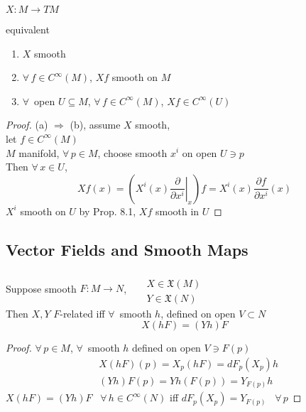 \begin{proposition}[8.14]
$X: M \to TM$ 

equivalent
\begin{enumerate}
\item[(a)] $X$ smooth 
\item[(b)] $\forall \, f \in C^{\infty}(M)$, $Xf $ smooth on $M$ 
\item[(c)] $\forall \, $ open $U \subseteq M$, $\forall \, f \in C^{\infty}(M)$, $Xf \in C^{\infty}(U)$
\end{enumerate}
\end{proposition}

\begin{proof}
  (a) $\Longrightarrow $ (b), assume $X$ smooth, \\
let $f\in C^{\infty}(M)$ \\
$M$ manifold, $\forall \, p \in M$, choose smooth $x^i$ on open $U\ni p$ \\
Then $\forall \, x \in U$, 
\[
Xf(x) = \left( \left. X^i(x) \frac{ \partial }{ \partial x^i} \right|_x \right) f = X^i(x) \frac{ \partial f}{ \partial x^i}(x)
\]
$X^i$ smooth on $U$ by Prop. 8.1, $Xf$ smooth in $U$
\end{proof}

\subsection*{Vector Fields and Smooth Maps}

\begin{proposition}[8.16]
  Suppose smooth $F:M\to N$, \quad \, $\begin{aligned} & \quad \\ 
    & X \in \mathfrak{X}(M) \\
    & Y \in \mathfrak{X}(N) \end{aligned}$ \\

Then $X,Y$ $F$-related iff $\forall \, $ smooth $h$, defined on open $V \subset N$ 
\[
X(hF) = (Yh)F
\]



\end{proposition}

\begin{proof}
$\forall \, p \in M$, $\forall \, $ smooth $h$ defined on open $V \ni F(p)$ 
\[
\begin{aligned}
  & X(hF)(p) = X_p(hF) = dF_p(X_p)h \\ 
  & (Yh)F(p) = Yh(F(p)) = Y_{F(p)}h
\end{aligned}
\]
$X(hF) = (Yh)F$ \quad \, $\forall \, h \in C^{\infty}(N)$ iff $dF_p(X_p) = Y_{F(p)}$ \, $\forall \, p$




\end{proof}




